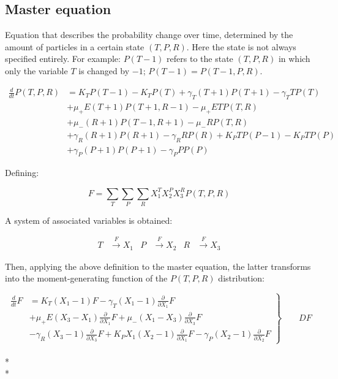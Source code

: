 \documentclass{article}
\begin{document}
\subsection{ Master equation}

Equation that describes the probability change over time, determined by the amount of particles in a certain state $(T, P, R)$. Here the state is not always specified entirely. For example: $P(T-1)$ refers to the state $(T, P, R)$ in which only the variable $T$ is changed by $-1$; $P(T-1)=P(T-1, P, R)$.

\begin{align*}
    \frac{d}{dt}P(T,P,R) &= K_TP(T-1) - K_TP(T) + \gamma_T(T+1)P(T+1) - \gamma_TTP(T) \\
                         &+ \mu_+E(T+1)P(T+1,R-1) - \mu_+ETP(T,R) \\
                         &+ \mu_-(R+1)P(T-1,R+1) - \mu_-RP(T,R)\\
                         &+ \gamma_R(R+1)P(R+1) - \gamma_RRP(R) + K_PTP(P-1) - K_PTP(P)\\
                         &+ \gamma_P(P+1)P(P+1) - \gamma_PPP(P)
\end{align*}

Defining:

\begin{equation}
    F = \sum_T\sum_P\sum_R X_1^TX_2^PX_3^RP(T,P,R)
\end{equation}


A system of associated variables is obtained:

\begin{align*}
    T & \xrightarrow{F} X_1  &  P &\xrightarrow{F} X_2  &  R &\xrightarrow{F} X_3
\end{align*}

Then, applying the above definition to the master equation, the latter transforms into the moment-generating function of the $P(T,P,R)$ distribution: 

\begin{equation}
    \left.\begin{aligned}
            \frac{d}{dt}F &= K_T(X_1 -1)F - \gamma_T(X_1 - 1)\frac{\partial}{\partial X_1}F\\
                          &+ \mu_+E(X_3 - X_1)\frac{\partial}{\partial X_1}F + \mu_-(X_1 - X_3)\frac{\partial}{\partial X_3}F\\
                          &- \gamma_R(X_3 - 1)\frac{\partial}{\partial X_3}F + K_PX_1(X_2 - 1)\frac{\partial}{\partial X_1}F - \gamma_P(X_2 - 1)\frac{\partial}{\partial X_2}F
            \end{aligned}
    \right\}
    \qquad DF
 \end{equation}
\\*
\\*
\end{document}
